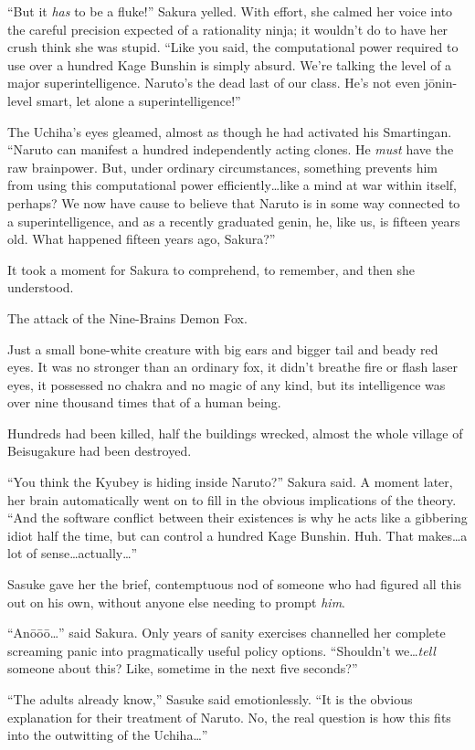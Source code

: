 “But it \emph{has} to be a fluke!” Sakura yelled. With effort, she calmed her voice into the careful precision expected of a rationality ninja; it wouldn’t do to have her crush think she was stupid. “Like you said, the computational power required to use over a hundred Kage Bunshin is simply absurd. We’re talking the level of a major superintelligence. Naruto’s the dead last of our class. He’s not even jōnin-level smart, let alone a superintelligence!”

The Uchiha’s eyes gleamed, almost as though he had activated his Smartingan. “Naruto can manifest a hundred independently acting clones. He \emph{must} have the raw brainpower. But, under ordinary circumstances, something prevents him from using this computational power efficiently…like a mind at war within itself, perhaps? We now have cause to believe that Naruto is in some way connected to a superintelligence, and as a recently graduated genin, he, like us, is fifteen years old. What happened fifteen years ago, Sakura?”

It took a moment for Sakura to comprehend, to remember, and then she understood.

The attack of the Nine-Brains Demon Fox.

Just a small bone-white creature with big ears and bigger tail and beady red eyes. It was no stronger than an ordinary fox, it didn’t breathe fire or flash laser eyes, it possessed no chakra and no magic of any kind, but its intelligence was over nine thousand times that of a human being.

Hundreds had been killed, half the buildings wrecked, almost the whole village of Beisugakure had been destroyed.

“You think the Kyubey is hiding inside Naruto?” Sakura said. A moment later, her brain automatically went on to fill in the obvious implications of the theory. “And the software conflict between their existences is why he acts like a gibbering idiot half the time, but can control a hundred Kage Bunshin. Huh. That makes…a lot of sense…actually…”

Sasuke gave her the brief, contemptuous nod of someone who had figured all this out on his own, without anyone else needing to prompt \emph{him}.

“Anōōō…” said Sakura. Only years of sanity exercises channelled her complete screaming panic into pragmatically useful policy options. “Shouldn’t we…\emph{tell} someone about this? Like, sometime in the next five seconds?”

“The adults already know,” Sasuke said emotionlessly. “It is the obvious explanation for their treatment of Naruto. No, the real question is how this fits into the outwitting of the Uchiha…”

